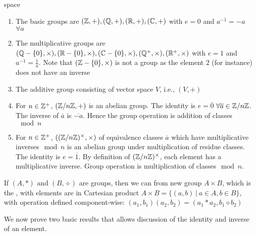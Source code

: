 \begin{example}{\color{white}space}
\begin{enumerate}[label=(\roman*)]
\setlength{\itemsep}{0pt}
\item The basic groups are $(\mathbb{Z}, +), (\mathbb{Q}, +), (\mathbb{R}, +), (\mathbb{C}, +)$ with $e=0$ and $a^{-1} = -a$ $\forall a$
\item The multiplicative groups are $(\mathbb{Q} - \{0\}, \times), (\mathbb{R}- \{0\}, \times), (\mathbb{C}- \{0\}, \times), (\mathbb{Q}^+, \times), (\mathbb{R}^+, \times)$ with $e=1$ and $a^{-1} = \frac{1}{a}$. Note that $(\mathbb{Z} - \{0\}, \times)$ is not a group as the element $2$ (for instance) does not have an inverse
\item The additive group consisting of vector space $V$, i.e., $(V,+)$
\item For $n \in \mathbb{Z}^+$, $(\mathbb{Z} / n\mathbb{Z}, +)$ is an abelian group. The identity is $e=\overline{0}$ $\forall \overline{a} \in \mathbb{Z} / n\mathbb{Z}$. The inverse of $\overline{a}$ is $\overline{-a}$. Hence the group operation is addition of classes$\mod{n}$
\item For $n \in \mathbb{Z}^+$, $((\mathbb{Z} / n\mathbb{Z})^{\times}, \times)$ of equivalence classes $\overline{a}$ which have multiplicative inverses$\mod{n}$ is an abelian group under multiplication of residue classes. The identity is $e=\overline{1}$. By definition of $(\mathbb{Z} / n\mathbb{Z})^{\times}$, each element has a multiplicative inverse. Group operation is multiplication of classes$\mod{n}$. 
\end{enumerate}
\end{example}

\begin{definition}
If $(A, *)$ and $(B,\diamond)$ are groups, then we can from new group $A \times B$, which is the , with elements are in Cartesian product $A \times B = \{(a,b) \ | \ a\in A, b\in B\}$, with operation defined component-wise: $(a_1, b_1)(a_2, b_2) = (a_1 * a_2, b_1 \diamond b_2)$
\end{definition}

We now prove two basic results that allows discussion of the identity and inverse of an element.

